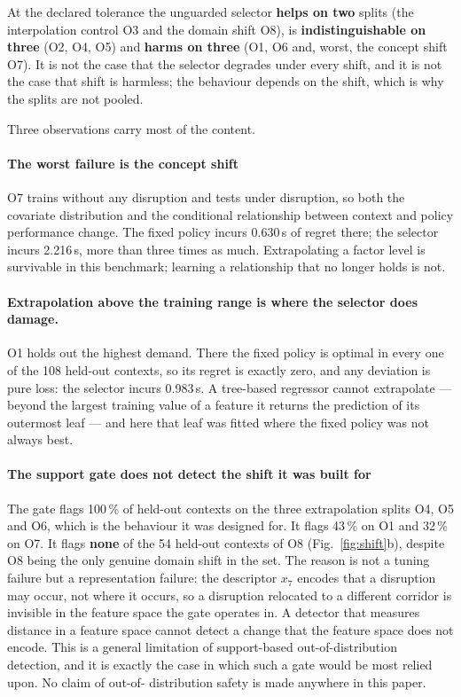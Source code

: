 \documentclass[preprint,12pt]{elsarticle}
\begin{document}
At the declared tolerance the unguarded selector \textbf{helps on two} splits
(the interpolation control O3 and the domain shift O8), is
\textbf{indistinguishable on three} (O2, O4, O5) and \textbf{harms on three}
(O1, O6 and, worst, the concept shift O7). It is not the case that the selector
degrades under every shift, and it is not the case that shift is harmless; the
behaviour depends on the shift, which is why the splits are not pooled.

Three observations carry most of the content.

\paragraph{The worst failure is the concept shift} O7 trains without any
disruption and tests under disruption, so both the covariate distribution and the
conditional relationship between context and policy performance change. The fixed
policy incurs 0.630\,s of regret there; the selector incurs 2.216\,s, more than
three times as much. Extrapolating a factor level is survivable in this benchmark;
learning a relationship that no longer holds is not.

\paragraph{Extrapolation above the training range is where the selector does
damage.} O1 holds out the highest demand. There the fixed policy is optimal in
every one of the 108 held-out contexts, so its regret is exactly zero, and any
deviation is pure loss: the selector incurs 0.983\,s. A tree-based regressor
cannot extrapolate --- beyond the largest training value of a feature it returns
the prediction of its outermost leaf --- and here that leaf was fitted where the
fixed policy was not always best.

\paragraph{The support gate does not detect the shift it was built for} The gate
flags 100\,\% of held-out contexts on the three extrapolation splits O4, O5 and
O6, which is the behaviour it was designed for. It flags 43\,\% on O1 and 32\,\%
on O7. It flags \textbf{none} of the 54 held-out contexts of O8
(Fig.~\ref{fig:shift}b), despite O8 being the only genuine domain shift in the
set. The reason is not a tuning failure but a representation failure: the
descriptor $x_7$ encodes that a disruption may occur, not where it occurs, so a
disruption relocated to a different corridor is invisible in the feature space the
gate operates in. A detector that measures distance in a feature space cannot
detect a change that the feature space does not encode. This is a general
limitation of support-based out-of-distribution detection, and it is exactly the
case in which such a gate would be most relied upon. No claim of out-of-
distribution safety is made anywhere in this paper.
\end{document}
